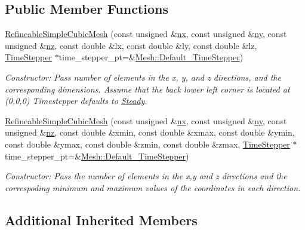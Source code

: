 \subsection*{Public Member Functions}
\begin{DoxyCompactItemize}
\item 
\hyperlink{classoomph_1_1RefineableSimpleCubicMesh_a71fab83f3bdc3f0cf7676afb5e313d10}{Refineable\+Simple\+Cubic\+Mesh} (const unsigned \&\hyperlink{classoomph_1_1SimpleCubicMesh_ad29c917ec0adb29ad24e086e3dcd0b6f}{nx}, const unsigned \&\hyperlink{classoomph_1_1SimpleCubicMesh_a16979ec3b0e88fb37730415190021c1c}{ny}, const unsigned \&\hyperlink{classoomph_1_1SimpleCubicMesh_ad78725440e4e87598fd9339653b28e61}{nz}, const double \&lx, const double \&ly, const double \&lz, \hyperlink{classoomph_1_1TimeStepper}{Time\+Stepper} $\ast$time\+\_\+stepper\+\_\+pt=\&\hyperlink{classoomph_1_1Mesh_a12243d0fee2b1fcee729ee5a4777ea10}{Mesh\+::\+Default\+\_\+\+Time\+Stepper})
\begin{DoxyCompactList}\small\item\em Constructor\+: Pass number of elements in the x, y, and z directions, and the corresponding dimensions. Assume that the back lower left corner is located at (0,0,0) Timestepper defaults to \hyperlink{classoomph_1_1Steady}{Steady}. \end{DoxyCompactList}\item 
\hyperlink{classoomph_1_1RefineableSimpleCubicMesh_a058dc3781f5bf9b5580380e1161ad7d5}{Refineable\+Simple\+Cubic\+Mesh} (const unsigned \&\hyperlink{classoomph_1_1SimpleCubicMesh_ad29c917ec0adb29ad24e086e3dcd0b6f}{nx}, const unsigned \&\hyperlink{classoomph_1_1SimpleCubicMesh_a16979ec3b0e88fb37730415190021c1c}{ny}, const unsigned \&\hyperlink{classoomph_1_1SimpleCubicMesh_ad78725440e4e87598fd9339653b28e61}{nz}, const double \&xmin, const double \&xmax, const double \&ymin, const double \&ymax, const double \&zmin, const double \&zmax, \hyperlink{classoomph_1_1TimeStepper}{Time\+Stepper} $\ast$time\+\_\+stepper\+\_\+pt=\&\hyperlink{classoomph_1_1Mesh_a12243d0fee2b1fcee729ee5a4777ea10}{Mesh\+::\+Default\+\_\+\+Time\+Stepper})
\begin{DoxyCompactList}\small\item\em Constructor\+: Pass the number of elements in the x,y and z directions and the correspoding minimum and maximum values of the coordinates in each direction. \end{DoxyCompactList}\end{DoxyCompactItemize}
\subsection*{Additional Inherited Members}


